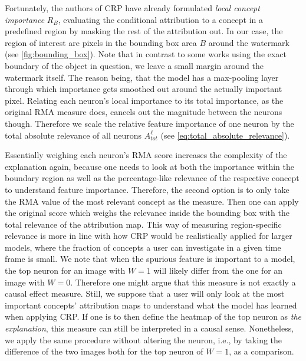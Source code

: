 Fortunately, the authors of CRP have already formulated \textit{local concept importance} $R_B$, evaluating the conditional attribution to a concept in a predefined region by masking the rest of the attribution out.  In our case, the region of interest are pixels in the bounding box area $B$ around the watermark (see \cref{fig:bounding_box}). Note that in contrast to some works using the exact boundary of the object in question, we leave a small margin around the watermark itself. The reason being, that the model has a max-pooling layer through which importance gets smoothed out around the actually important pixel. Relating each neuron's local importance to its total importance, as the original RMA measure does, cancels out the magnitude between the neurons though. Therefore we scale the relative feature importance of one neuron by the total absolute relevance of all neurons $A_{tot}^{\ell}$ (see \cref{eq:total_absolute_relevance}). 

Essentially weighing each neuron's RMA score increases the complexity of the explanation again, because one needs to look at both the importance within the boundary region as well as the percentage-like relevance of the respective concept to understand feature importance. 
Therefore, the second option is to only take the RMA value of the most relevant concept as the measure. Then one can apply the original score which weighs the relevance inside the bounding box with the total relevance of the attribution map. This way of measuring region-specific relevance is more in line with how CRP would be realistically applied for larger models, where the fraction of concepts a user can investigate in a given time frame is small. We note that when the spurious feature is important to a model, the top neuron for an image with $W=1$ will likely differ from the one for an image with $W=0$. Therefore one might argue that this measure is not exactly a causal effect measure. Still, we suppose that a user will only look at the most important concepts' attribution maps to understand what the model has learned when applying CRP. If one is to then define the heatmap of the top neuron as \textit{the explanation}, this measure can still be interpreted in a causal sense. Nonetheless, we apply the same procedure without altering the neuron, i.e., by taking the difference of the two images both for the top neuron of $W=1$, as a comparison.

